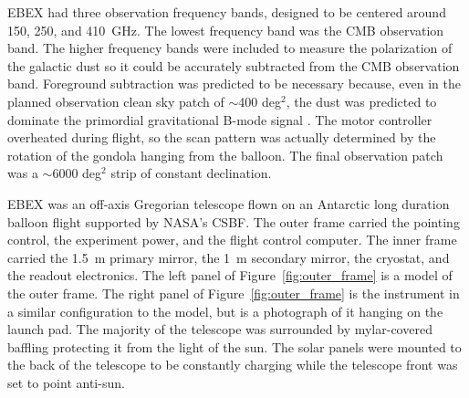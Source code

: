 \ac{EBEX} had three observation frequency bands, designed to be centered around 150, 250, and 410~GHz. 
The lowest frequency band was the \ac{CMB} observation band. 
The higher frequency bands were included to measure the polarization of the galactic dust so it could be accurately subtracted from the \ac{CMB} observation band. 
Foreground subtraction was predicted to be necessary because, even in the planned observation clean sky patch of $\sim$400 deg$^2$, the dust was predicted to dominate the primordial gravitational B-mode signal \cite{Bao2015}. 
The motor controller overheated during flight, so the scan pattern was actually determined by the rotation of the gondola hanging from the balloon. 
The final observation patch was a $\sim$6000 deg$^2$ strip of constant declination.%

\ac{EBEX} was an off-axis Gregorian
 telescope flown on an Antarctic long duration balloon flight supported by \ac{NASA}'s \ac{CSBF}. 
The outer frame carried the pointing control, the experiment power, and the flight control computer. 
The inner frame carried the 1.5~m primary mirror, the 1~m secondary mirror, the cryostat, and the readout electronics. 
The left panel of Figure~\ref{fig:outer_frame} is a model of the outer frame. 
The right panel of Figure~\ref{fig:outer_frame} is the instrument in a similar configuration to the model, but is a photograph of it hanging on the launch pad. 
The majority of the telescope was surrounded by mylar-covered baffling protecting it from the light of the sun. 
The solar panels were mounted to the back of the telescope to be constantly charging while the telescope front was set to point anti-sun. 

